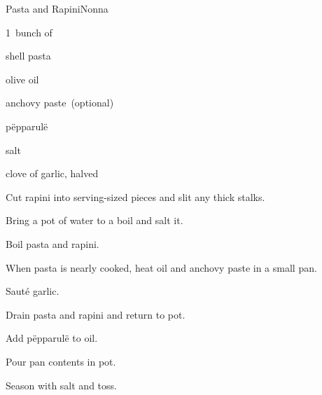 \begin{recipe}{Pasta and Rapini}{Nonna}{}

\begin{ingredients}
\item 1~bunch of 
\item {} shell pasta
\item olive oil
\item anchovy paste~(optional)
\item pëpparulë
\item salt
\item clove of garlic, halved
\end{ingredients}

\begin{directions}
\item Cut rapini into serving-sized pieces and slit any thick stalks.
\item Bring a pot of water to a boil and salt it.
\item Boil pasta and rapini.
\item When pasta is nearly cooked, heat oil and anchovy paste in a small pan.
\item Sauté garlic.
\item Drain pasta and rapini and return to pot.
\item Add pëpparulë to oil.
\item Pour pan contents in pot.
\item Season with salt and toss.
\end{directions}

\end{recipe}
